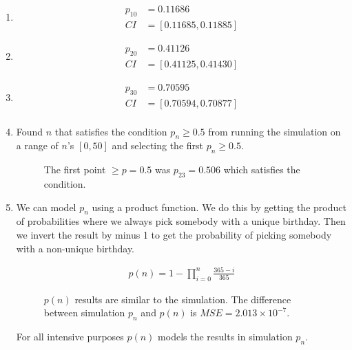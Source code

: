 \documentclass[twocolumn]{article}
\begin{document}
\begin{enumerate}[label=\alph*),itemsep=-1.5em]
    
\item 
\begin{align*}
p_{10} &= 0.11686 \\
CI &= [0.11685, 0.11885]
\end{align*}


\item 
\begin{align*}
p_{20} &=  0.41126 \\
CI &= [0.41125, 0.41430]
\end{align*}


\item
\begin{align*}
p_{30} &= 0.70595 \\
CI &= [0.70594, 0.70877]\\
\end{align*}

\item 
Found $n$ that satisfies the condition $p_n \ge 0.5$ from running the simulation on a range of $n$'s $[0, 50]$ and selecting the first $p_n \ge 0.5$.

\vspace{-5pt}
\begin{figure}[H]
    \centering
    \caption{The first point $\geq p=0.5$ was $p_{23}=0.506$ which satisfies the condition.}
\end{figure}


\item 
We can model $p_n$ using a product function. We do this by getting the product of probabilities where we always pick somebody with a unique birthday. Then we invert the result by minus 1 to get the probability of picking somebody with a non-unique birthday.

\vspace{-10pt}
\begin{align*}
p(n) = 1 - \prod_{i=0}^{n} \frac{\text{365} - i}{365}
\end{align*}
\vspace{-10pt}

\begin{figure}[H]
    \centering
    \caption{$p(n)$ results are similar to the simulation. The difference between simulation $p_n$ and $p(n)$ is $MSE = 2.013\times10^{-7}$.}
\end{figure}
\vspace{-14pt}
For all intensive purposes $p(n)$ models the results in simulation $p_n$. 

\end{enumerate}
\end{document}
